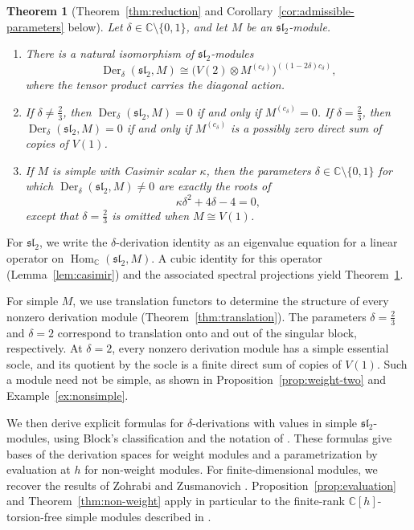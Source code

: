 \documentclass[11pt,reqno]{amsart}
\numberwithin{equation}{section}
\newcommand{\C}{\mathbb C}
\newcommand{\s}{\mathfrak{sl}_2}
\DeclareMathOperator{\Der}{Der}
\DeclareMathOperator{\Hom}{Hom}
\newtheorem{theoremB}{Theorem}
\theoremstyle{definition}
\theoremstyle{remark}
\begin{document}
\begin{theoremB}[Theorem~\ref{thm:reduction} and Corollary~\ref{cor:admissible-parameters} below]\label{thm:main-rank-one}
Let \(\delta\in\C\setminus\{0,1\}\), and let \(M\) be an
\(\s\)-module.
\begin{enumerate}
\item There is a natural isomorphism of \(\s\)-modules
\begin{equation}\label{eq:intro-rank-one}
\Der_\delta(\s,M)
\cong\bigl(V(2)\otimes M^{(c_\delta)}\bigr)^{((1-2\delta)c_\delta)},
\end{equation}
where the tensor product carries the diagonal action.

\item If \(\delta\ne\frac{2}{3}\), then
\(\Der_\delta(\s,M)=0\) if and only if \(M^{(c_\delta)}=0\).
If \(\delta=\frac{2}{3}\), then \(\Der_\delta(\s,M)=0\) if and
only if \(M^{(c_\delta)}\) is a possibly zero direct sum of copies
of \(V(1)\).

\item If \(M\) is simple with Casimir scalar \(\kappa\), then
the parameters \(\delta\in\C\setminus\{0,1\}\) for which
\(\Der_\delta(\s,M)\ne0\) are exactly the roots of
\begin{equation}\label{eq:intro-criterion}
\kappa\delta^2+4\delta-4=0,
\end{equation}
except that \(\delta=\frac{2}{3}\) is omitted when \(M\cong V(1)\).
\end{enumerate}
\end{theoremB}

For \(\s\), we write the \(\delta\)-derivation identity as an
eigenvalue equation for a linear operator on \(\Hom_\C(\s,M)\).
A cubic identity for this operator
(Lemma~\ref{lem:casimir}) and the associated spectral projections yield
Theorem~\ref{thm:main-rank-one}.

For simple \(M\), we use translation functors to determine the
structure of every nonzero derivation module
(Theorem~\ref{thm:translation}). The parameters
\(\delta=\frac{2}{3}\) and \(\delta=2\) correspond to translation
onto and out of the singular block, respectively. At \(\delta=2\),
every nonzero derivation module has a simple essential socle,
and its quotient by the socle is a finite direct sum of copies
of \(V(1)\). Such a module need not be simple, as shown in
Proposition~\ref{prop:weight-two} and Example~\ref{ex:nonsimple}.

We then derive explicit formulas for \(\delta\)-derivations with
values in simple \(\s\)-modules, using Block's classification
\cite{Bavula90,Block81} and the notation of \cite{Maz10}.
These formulas give bases of the derivation spaces for weight
modules and a parametrization by evaluation at \(h\) for
non-weight modules.
For finite-dimensional modules, we recover the results of Zohrabi
and Zusmanovich \cite{ZZ21}. Proposition~\ref{prop:evaluation} and
Theorem~\ref{thm:non-weight} apply in particular to the finite-rank
\(\C[h]\)-torsion-free simple modules described in
\cite{GKM26,GNZ26a,GNZ26b,MX26}.
\end{document}
